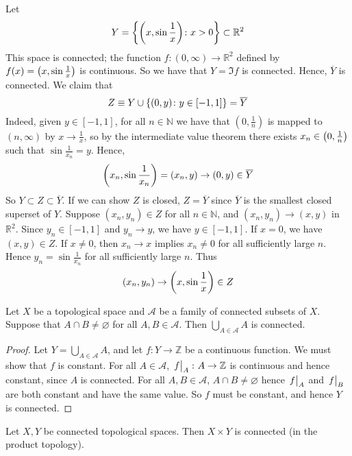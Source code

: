 \begin{example}
	Let
	\[ Y = \qty{\qty(x, \sin\frac{1}{x}) \colon x > 0} \subset \mathbb R^2 \]
	This space is connected; the function \( f \colon (0, \infty) \to \mathbb R^2 \) defined by \( f(x) = \qty(x,\sin \frac{1}{x}) \) is continuous.
	So we have that \( Y = \Im f \) is connected.
	Hence, \( \overline Y \) is connected.
	We claim that
	\[ Z \equiv Y \cup \qty{(0,y) \colon y \in [-1,1]} = \overline Y \]
	Indeed, given \( y \in [-1,1] \), for all \( n \in \mathbb N \) we have that \( (0, \frac{1}{n}) \) is mapped to \( (n,\infty) \) by \( x \to \frac{1}{x} \), so by the intermediate value theorem there exists \( x_n \in \qty(0, \frac{1}{n}) \) such that \( \sin \frac{1}{x_n} = y \).
	Hence,
	\[ \qty(x_n, \sin \frac{1}{x_n}) = (x_n, y) \to (0,y) \in \overline Y \]
	So \( Y \subset Z \subset \overline Y \).
	If we can show \( Z \) is closed, \( Z = \overline Y \) since \( \overline Y \) is the smallest closed superset of \( Y \).
	Suppose \( (x_n, y_n) \in Z \) for all \( n \in \mathbb N \), and \( (x_n, y_n) \to (x,y) \) in \( \mathbb R^2 \).
	Since \( y_n \in [-1,1] \) and \( y_n \to y \), we have \( y \in [-1,1] \).
	If \( x = 0 \), we have \( (x,y) \in Z \).
	If \( x \neq 0 \), then \( x_n \to x \) implies \( x_n \neq 0 \) for all sufficiently large \( n \).
	Hence \( y_n = \sin \frac{1}{x_n} \) for all sufficiently large \( n \).
	Thus
	\[ (x_n, y_n) \to \qty(x, \sin \frac{1}{x}) \in Z \]
\end{example}
\begin{lemma}
	Let \( X \) be a topological space and \( \mathcal A \) be a family of connected subsets of \( X \).
	Suppose that \( A \cap B \neq \varnothing \) for all \( A, B \in \mathcal A \).
	Then \( \bigcup_{A \in \mathcal A} A \) is connected.
\end{lemma}
\begin{proof}
	Let \( Y = \bigcup_{A \in \mathcal A} A \), and let \( f \colon Y \to \mathbb Z \) be a continuous function.
	We must show that \( f \) is constant.
	For all \( A \in \mathcal A \), \( \eval{f}_A \colon A \to \mathbb Z \) is continuous and hence constant, since \( A \) is connected.
	For all \( A, B \in \mathcal A \), \( A \cap B \neq \varnothing \) hence \( \eval{f}_A \) and \( \eval{f}_B \) are both constant and have the same value.
	So \( f \) must be constant, and hence \( Y \) is connected.
\end{proof}
\begin{theorem}
	Let \( X, Y \) be connected topological spaces.
	Then \( X \times Y \) is connected (in the product topology).
\end{theorem}
